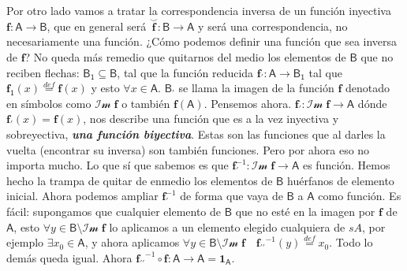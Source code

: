 \documentclass{amsart}
\theoremstyle{definition}
\theoremstyle{remark}
\numberwithin{equation}{section}
\newcommand{\fromto}{\longrightarrow}
\newcommand{\setsymbol}[1]{\textsf{#1}}
\newcommand{\sA}{\setsymbol{A}}
\newcommand{\sB}{\setsymbol{B}}
\newcommand{\mthds}[1]{\setsymbol{#1}}
\newcommand{\monrel}[1]{\mathbf{#1}}
\newcommand{\monrelinv}[1]{\overset{\smallsmile}{\monrel{#1}}}
\newcommand{\funct}[1]{\monrel{#1}}
\newcommand{\functat}[2]{\funct{#1}{\left({#2}\right)}}
\newcommand{\defin}{\overset {def}{=}}
\begin{document}
	Por otro lado vamos a tratar la correspondencia inversa de un función 
inyectiva $\funct{f}:\sA \fromto \sB$, que en general será $\monrelinv{f}:\sB 
\fromto \sA$ y será una correspondencia, no necesariamente una función. ¿Cómo 
podemos definir una función que sea inversa de $\funct{f}$? No queda más 
remedio que quitarnos del medio los elementos de $\sB$ que no reciben 
flechas: ${\sB}_{\mthds 1}\subseteq{\sB}$, tal que la función reducida 
${\funct{f}}_{\prime} : \sA \fromto {\sB}_{\mthds 1}$ tal que $ 
{\funct{f}}_{\mthds 1} \left( {x} \right) \defin \funct{f} \left( {x} 
\right)$ y esto $\forall x \in \sA$. $ {\sB}_{\prime} $ se llama la imagen de 
la función $\funct{f}$ denotado en símbolos como $\mathcal{Im}\;\funct{f}$ o 
también $\functat{f}{\sA}$. Pensemos ahora. 
${\funct{f}}_{\prime}:\mathcal{Im}\;\funct{f}\fromto\sA$ dónde 
${\funct{f}}_{\prime}\left(x\right)=\functat{f}{x}$, nos describe una función 
que es a la vez inyectiva y sobreyectiva, \textbf{\emph{una función 
biyectiva}}. Estas son las funciones que al darles la vuelta (encontrar su 
inversa) son también funciones. Pero por ahora eso no importa mucho. Lo que 
sí que sabemos es que ${\funct{f}}_{\prime}^{-1} : \mathcal{Im} \; \funct{f} 
\fromto \sA$ es función. Hemos hecho la trampa de quitar de enmedio los 
elementos de $\sB$ huérfanos de elemento inicial. Ahora podemos ampliar 
${\funct{f}}_{\prime}^{-1}$ de forma que vaya de $\sB$ a $\sA$ como función. 
Es fácil: supongamos que cualquier elemento de $\sB$ que no esté en la imagen 
por $\funct{f}$ de $\sA$, esto $\forall y \in \sB \setminus \mathcal{Im} \; 
\funct{f}$ lo aplicamos a un elemento elegido cualquiera de $sA$, por ejemplo 
$\exists x_0 \in \sA$, y ahora aplicamos $\forall y \in \sB \setminus 
\mathcal{Im} \; \funct{f} \quad {{\funct{f}}_{\prime\prime}}^{ -1 } \left( y 
\right) \defin x_0$. Todo lo demás queda igual. Ahora 
${{\funct{f}}_{\prime\prime}}^{ -1 } \circ \funct{f} : \sA \fromto \sA = { 
\funct{1} }_{ \sA }$.
\end{document}
